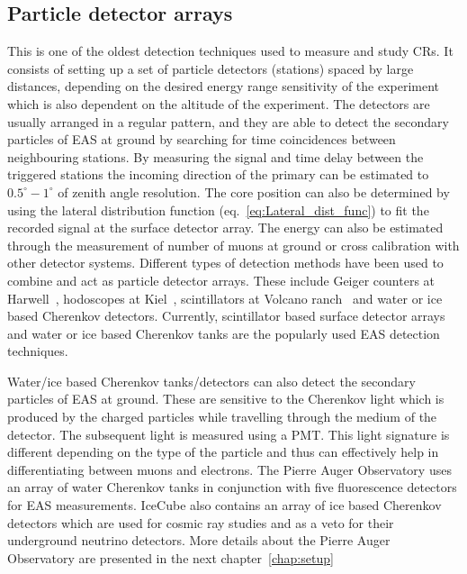 \subsection{Particle detector arrays}
\label{sec:EAS_particle}
This is one of the oldest detection techniques used to measure and study CRs. It consists of setting up a set of particle detectors (stations) spaced by large distances, depending on the desired energy range sensitivity of the experiment which is also dependent on the altitude of the experiment. The detectors are usually arranged in a regular pattern, and they are able to detect the secondary particles of EAS at ground by searching for time coincidences between neighbouring stations. By measuring the signal and time delay between the triggered stations the incoming direction of the primary can be estimated to $0.5^{\circ}-1^{\circ}$ of zenith angle resolution. The core position can also be determined by using the lateral distribution function (eq.~\ref{eq:Lateral_dist_func}) to fit the recorded signal at the surface detector array. The energy can also be estimated through the measurement of number of muons at ground or cross calibration with other detector systems. Different types of detection methods have been used to combine and act as particle detector arrays. These include Geiger counters at Harwell~\cite{1953Natur.171..349G}, hodoscopes at Kiel~\cite{1965ICRC....2..738B}, scintillators at Volcano ranch~\cite{Linsley1961485} and water or ice based Cherenkov detectors. Currently, scintillator based surface detector arrays and water or ice based Cherenkov tanks are the popularly used EAS detection techniques. 

Water/ice based Cherenkov tanks/detectors can also detect the secondary particles of EAS at ground. These are sensitive to the Cherenkov light which is produced by the charged particles while travelling through the medium of the detector. The subsequent light is measured using a \gls{PMT}. This light signature is different depending on the type of the particle and thus can effectively help in differentiating between muons and electrons. The Pierre Auger Observatory uses an array of water Cherenkov tanks in conjunction with five fluorescence detectors for EAS measurements. IceCube also contains an array of ice based Cherenkov detectors which are used for cosmic ray studies and as a veto for their underground neutrino detectors. More details about the Pierre Auger Observatory are presented in the next chapter~\ref{chap:setup}

